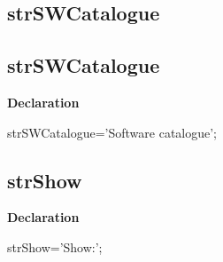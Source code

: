\documentclass{report}
\newif\ifpdf
\begin{document}
\subsection*{\large{\textbf{strSWCatalogue}}\normalsize\hspace{1ex}\hrulefill}
\else
\subsection*{strSWCatalogue}
\fi
\label{trstrings-strSWCatalogue}
\begin{list}{}{
\setlength{\itemindent}{0cm}
\setlength{\listparindent}{0cm}
\setlength{\leftmargin}{\evensidemargin}
\addtolength{\leftmargin}{\tmplength}
\settowidth{\labelsep}{X}
\addtolength{\leftmargin}{\labelsep}
\setlength{\labelwidth}{\tmplength}
}
\item[\textbf{Declaration}\hfill]
\ifpdf
\begin{flushleft}
\fi
\begin{ttfamily}
strSWCatalogue='Software catalogue';\end{ttfamily}

\ifpdf
\end{flushleft}
\fi

\end{list}
\ifpdf
\subsection*{\large{\textbf{strShow}}\normalsize\hspace{1ex}\hrulefill}
\else
\subsection*{strShow}
\fi
\label{trstrings-strShow}
\begin{list}{}{
\setlength{\itemindent}{0cm}
\setlength{\listparindent}{0cm}
\setlength{\leftmargin}{\evensidemargin}
\addtolength{\leftmargin}{\tmplength}
\settowidth{\labelsep}{X}
\addtolength{\leftmargin}{\labelsep}
\setlength{\labelwidth}{\tmplength}
}
\item[\textbf{Declaration}\hfill]
\ifpdf
\begin{flushleft}
\fi
\begin{ttfamily}
strShow='Show:';\end{ttfamily}

\ifpdf
\end{flushleft}
\fi

\end{list}
\ifpdf
\end{document}
